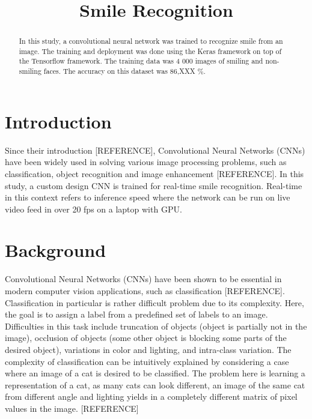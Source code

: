 \documentclass{article}
\title{Smile Recognition}
\begin{document}
\maketitle
\sloppy

\begin{abstract}
In this study, a convolutional neural network was trained to recognize
smile from an image. The training and deployment was done using the
Keras framework on top of the Tensorflow framework. The training data
was 4 000 images of smiling and non-smiling faces. The accuracy on
this dataset was 86,XXX \%.
\end{abstract}

\section{Introduction}\label{sec:intro}
Since their introduction [REFERENCE], Convolutional Neural Networks
(CNNs) have been widely used in solving various image processing
problems, such as classification, object recognition and image
enhancement [REFERENCE]. In this study, a custom design CNN is trained
for real-time smile recognition. Real-time in this context refers to
inference speed where the network can be run on live video feed in
over 20 fps on a laptop with GPU\@.

\section{Background}\label{sec:background}
Convolutional Neural Networks (CNNs) have been shown to be essential in
modern computer vision applications, such as classification
[REFERENCE]. Classification in particular is rather difficult problem
due to its complexity. Here, the goal is to assign a label from a
predefined set of labels to an image. Difficulties in this task
include truncation of objects (object is partially not in the image),
occlusion of objects (some other object is blocking some parts of
the desired object), variations in color and lighting, and intra-class
variation. The complexity of classification can be intuitively
explained by considering a case where an image of a cat is desired to
be classified. The problem here is learning a representation of a cat,
as many cats can look different, an image of the same cat from
different angle and lighting yields in a completely different matrix
of pixel values in the image. [REFERENCE]
\end{document}
